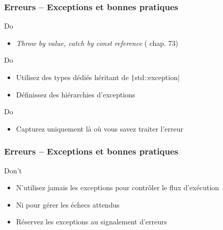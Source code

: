 \documentclass[C++.tex]{subfiles}
\begin{document}
\begin{frame}[fragile]
	\frametitle{Erreurs -- Exceptions et bonnes pratiques}
	\begin{exampleblock}{Do}
		\begin{itemize}
			\item \textit{Throw by value, catch by const reference} (\cite{coding} chap. 73)
		\end{itemize}
	\end{exampleblock}

	\begin{exampleblock}{Do}
		\begin{itemize}
			\item Utilisez des types dédiés héritant de \texttt|std::exception|


			\item Définissez des hiérarchies d'exceptions
		\end{itemize}
	\end{exampleblock}

	\begin{exampleblock}{Do}
		\begin{itemize}
			\item Capturez uniquement là où vous savez traiter l'erreur
		\end{itemize}
	\end{exampleblock}
\end{frame}

\begin{frame}[fragile]
	\frametitle{Erreurs -- Exceptions et bonnes pratiques}
	\begin{alertblock}{Don't}
		\begin{itemize}
			\item N'utilisez jamais les exceptions pour contrôler le flux d'exécution
			\item Ni pour gérer les \og échecs attendus\fg{}


			\item Réservez les exceptions au signalement d'erreurs
		\end{itemize}
	\end{alertblock}
\end{frame}
\end{document}
